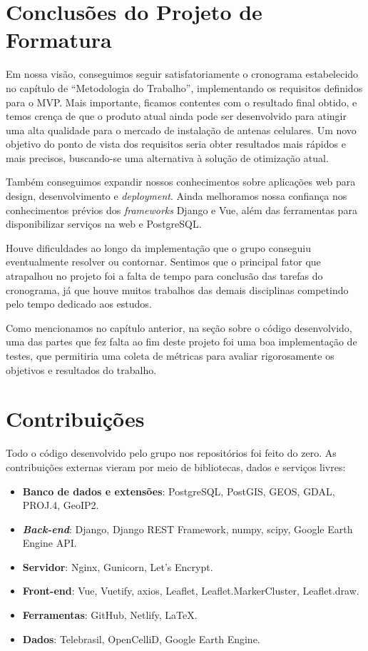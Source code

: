 \documentclass[]{politex}
\begin{document}
\section{Conclusões do Projeto de Formatura}

Em nossa visão, conseguimos seguir satisfatoriamente o cronograma estabelecido
no capítulo de ``Metodologia do Trabalho'', implementando os requisitos
definidos para o MVP. Mais importante, ficamos contentes com o resultado final
obtido, e temos crença de que o produto atual ainda pode ser desenvolvido para
atingir uma alta qualidade para o mercado de instalação de antenas celulares.
Um novo objetivo do ponto de vista dos requisitos seria obter resultados mais
rápidos e mais precisos, buscando-se uma alternativa à solução de otimização
atual.

Também conseguimos expandir nossos conhecimentos sobre aplicações web
para design, desenvolvimento e \textit{deployment}. Ainda melhoramos nossa
confiança nos conhecimentos prévios dos \textit{frameworks} Django e Vue, além
das ferramentas para disponibilizar serviços na web e PostgreSQL.

Houve dificuldades ao longo da implementação que o grupo conseguiu
eventualmente resolver ou contornar. Sentimos que o principal fator que
atrapalhou no projeto foi a falta de tempo para conclusão das tarefas do
cronograma, já que houve muitos trabalhos das demais disciplinas competindo
pelo tempo dedicado aos estudos.

Como mencionamos no capítulo anterior, na seção sobre o código desenvolvido,
uma das partes que fez falta ao fim deste projeto foi uma boa implementação de
testes, que permitiria uma coleta de métricas para avaliar rigorosamente os
objetivos e resultados do trabalho.

\section{Contribuições}

Todo o código desenvolvido pelo grupo nos repositórios foi feito do zero. As
contribuições externas vieram por meio de bibliotecas, dados e serviços livres:

\begin{itemize}
\item \textbf{Banco de dados e extensões}: PostgreSQL, PostGIS, GEOS, GDAL,
PROJ.4, GeoIP2.
\item \textbf{\textit{Back-end}}: Django, Django REST Framework, numpy, scipy,
Google Earth Engine API.
\item \textbf{Servidor}: Nginx, Gunicorn, Let's Encrypt.
\item \textbf{Front-end}: Vue, Vuetify, axios, Leaflet, Leaflet.MarkerCluster,
Leaflet.draw.
\item \textbf{Ferramentas}: GitHub, Netlify, LaTeX.
\item \textbf{Dados}: Telebrasil, OpenCelliD, Google Earth Engine.
\end{itemize}
\end{document}
